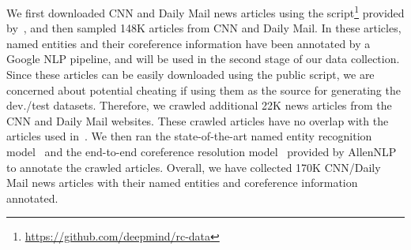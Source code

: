 We first downloaded CNN and Daily Mail news articles using the script\footnote{\url{https://github.com/deepmind/rc-data}} provided by~\citet{deepmind-cnn-dailymail}, 
and then sampled 148K articles from CNN and Daily Mail.
In these articles, named entities and their coreference information have been annotated by a Google NLP pipeline, and will be used in the second stage of our data collection.
Since these articles can be easily downloaded using the public script, we are concerned about potential cheating if using them as the source for generating the dev./test datasets.
Therefore, we crawled additional 22K news articles from the CNN and Daily Mail websites.
These crawled articles have no overlap with the articles used in~\citet{deepmind-cnn-dailymail}.
We then ran the state-of-the-art named entity recognition model~\cite{elmo} and the end-to-end coreference resolution model~\cite{end-to-end-coref} provided by AllenNLP~\cite{allennlp} to annotate the crawled articles.
Overall, we have collected 170K CNN/Daily Mail news articles with their named entities and coreference information annotated.


